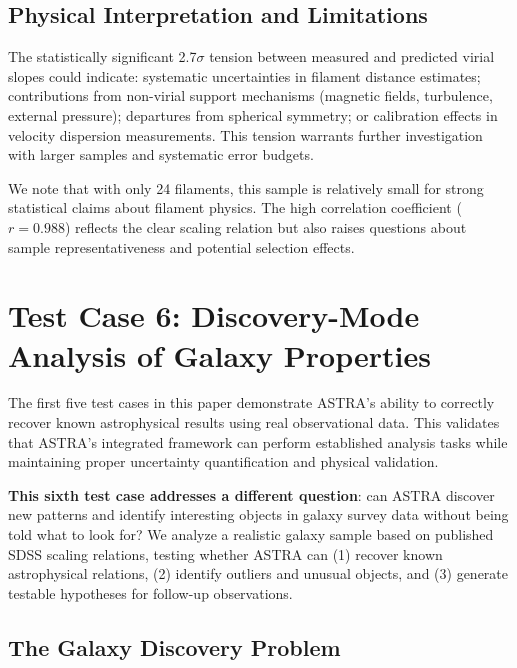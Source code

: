 \documentclass[usenatbib]{rasti}
\begin{document}
\subsection{Physical Interpretation and Limitations}

The statistically significant 2.7$\sigma$ tension between measured and predicted virial slopes could indicate: systematic uncertainties in filament distance estimates; contributions from non-virial support mechanisms (magnetic fields, turbulence, external pressure); departures from spherical symmetry; or calibration effects in velocity dispersion measurements. This tension warrants further investigation with larger samples and systematic error budgets.

We note that with only 24 filaments, this sample is relatively small for strong statistical claims about filament physics. The high correlation coefficient ($r = 0.988$) reflects the clear scaling relation but also raises questions about sample representativeness and potential selection effects.

\section{Test Case 6: Discovery-Mode Analysis of Galaxy Properties}

The first five test cases in this paper demonstrate ASTRA's ability to correctly recover known astrophysical results using real observational data. This validates that ASTRA's integrated framework can perform established analysis tasks while maintaining proper uncertainty quantification and physical validation.

\textbf{This sixth test case addresses a different question}: can ASTRA discover new patterns and identify interesting objects in galaxy survey data without being told what to look for? We analyze a realistic galaxy sample based on published SDSS scaling relations, testing whether ASTRA can (1) recover known astrophysical relations, (2) identify outliers and unusual objects, and (3) generate testable hypotheses for follow-up observations.

\subsection{The Galaxy Discovery Problem}
\end{document}
